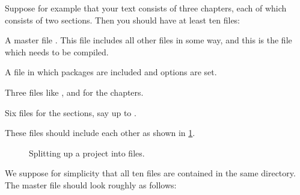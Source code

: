 Suppose for example that your text consists of three chapters, each of which consists of two sections.
Then you should have at least ten files:
\begin{myitemize}
  \item
    A master file .
    This file includes all other files in some way, and this is the file which needs to be compiled.
  \item
    A file  in which packages are included and options are set.
  \item
    Three files like ,  and  for the chapters.
  \item
    Six files for the sections, say  up to .
\end{myitemize}
These files should include each other as shown in \cref{file inclusion structure}.
\begin{figure}[tb]
  \begin{center}
  \end{center}
  \caption{Splitting up a project into files.}
  \label{file inclusion structure}
\end{figure}
We suppose for simplicity that all ten files are contained in the same directory.
The master file  should look roughly as follows:
%
